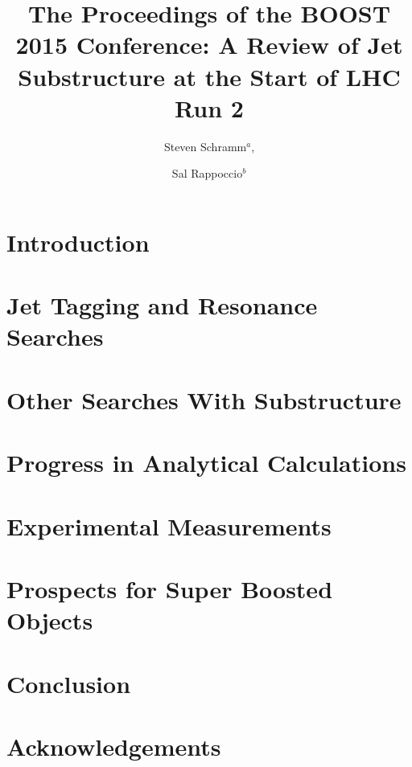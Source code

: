 \documentclass[a4paper,11pt]{article}
\title{\boldmath The Proceedings of the BOOST 2015 Conference: A Review of Jet Substructure at the Start of LHC Run 2}
\author{Steven Schramm$^{a}$,}
\author{Sal Rappoccio$^{b}$}
\affiliation{$^a$Universite de Geneve}
\affiliation{$^b$SUNY Buffalo}
\begin{document}
 
\maketitle
\flushbottom

\section{Introduction} 


\section{Jet Tagging and Resonance Searches}



\section{Other Searches With Substructure}



\section{Progress in Analytical Calculations}


\section{Experimental Measurements}


\section{Prospects for Super Boosted Objects}


\section{Conclusion}


\section{Acknowledgements}



\end{document}
